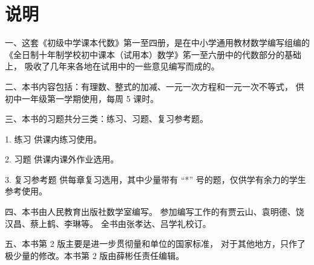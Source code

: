 
\chapter{说明}

一、这套《初级中学课本代数》第一至四册，是在中小学通用教材数学编写组编的
《全日制十年制学校初中课本（试用本）数学》笫一至六册中的代数部分的基础上，
吸收了几年来各地在试用中的一些意见编写而成的。

二、本书内容包括：有理数、整式的加减、一元一次方程和一元一次不等式，
供初中一年级第一学期使用，每周 5 课时。

三、本书的习题共分三类：练习、习题、复习参考题。

1. 练习 \quad 供课内练习使用。

2. 习题 \quad 供课内课外作业选用。

3. 复习参考题 \quad 供每章复习选用，其中少量带有 “*” 号的题，仅供学有余力的学生参考使用。

四、本书由人民教育出版社数学室编写。
参加编写工作的有贾云山、袁明德、饶汉昌、蔡上鹤、李琳等。
全书由张孝达、吕学礼校订。

五、本书第 2 版主要是进一步贯彻量和单位的国家标准，
对于其他地方，只作了极少量的修改。本书第 2 版由薛彬任责任编辑。





